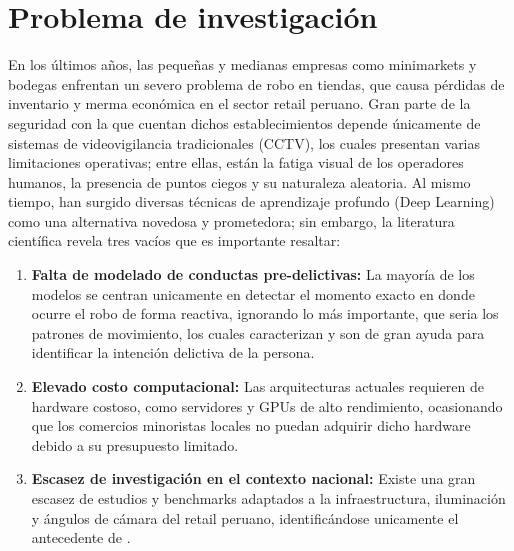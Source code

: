 \section{Problema de investigación}
	
En los últimos años, las pequeñas y medianas empresas como minimarkets y bodegas enfrentan un severo problema de robo en tiendas, que causa pérdidas de inventario y merma económica en el sector retail peruano. Gran parte de la seguridad con la que cuentan dichos establecimientos depende únicamente de sistemas de videovigilancia tradicionales (CCTV), los cuales presentan varias limitaciones operativas; entre ellas, están la fatiga visual de los operadores humanos, la presencia de puntos ciegos y su naturaleza aleatoria. Al mismo tiempo, han surgido diversas técnicas de aprendizaje profundo (Deep Learning) como una alternativa novedosa y prometedora; sin embargo, la literatura científica revela tres vacíos que es importante resaltar:

\begin{enumerate}[leftmargin=*, noitemsep, topsep=2pt] 
		\item \textbf{Falta de modelado de conductas pre-delictivas:} La mayoría de los modelos se centran unicamente en detectar el momento exacto en donde ocurre el robo de forma reactiva, ignorando lo más importante, que seria los patrones de movimiento, los cuales caracterizan y son de gran ayuda para identificar la intención delictiva de la persona.
\item \textbf{Elevado costo computacional:} Las arquitecturas actuales requieren de hardware costoso, como servidores y GPUs de alto rendimiento, ocasionando que los comercios minoristas locales no puedan adquirir dicho hardware debido a su presupuesto limitado.
\item \textbf{Escasez de investigación en el contexto nacional:} Existe una gran escasez de estudios y benchmarks adaptados a la infraestructura, iluminación y ángulos de cámara del retail peruano, identificándose unicamente el antecedente de \cite{aguero_intelligent_2025}.
	\end{enumerate}

